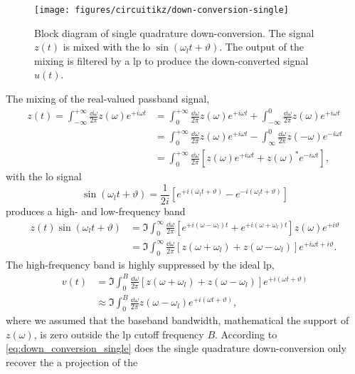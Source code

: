 \begin{figure}[htb]
	\centering
	\texttt{[image: figures/circuitikz/down-conversion-single]}
	\caption{Block diagram of single quadrature down-conversion. The signal $z(t)$ is mixed with the \gls{lo} $\sin(\omega_lt+\vartheta)$. The output of the mixing is filtered by a \gls{lp} to produce the down-converted signal $u(t)$.}\label{fig:down_conversion_single}
\end{figure}
The mixing of the real-valued passband signal,
\begin{equation}
	\begin{split}
		z(t)
		=
		\int_{-\infty}^{+\infty}\frac{\dd{\omega}}{2\pi}
		z(\omega)
		e^{+i\omega t}
		&=
		\int_0^{+\infty}\frac{\dd{\omega}}{2\pi}
		z(\omega)
		e^{+i\omega t}
		+
		\int_{-\infty}^0\frac{\dd{\omega}}{2\pi}
		z(\omega)
		e^{+i\omega t}
		\\
		&=
		\int_0^{+\infty}\frac{\dd{\omega}}{2\pi}
		z(\omega)
		e^{+i\omega t}
		-
		\int_{\infty}^0\frac{\dd{\omega}}{2\pi}
		z(-\omega)
		e^{-i\omega t}
		\\
		&=
		\int_0^{+\infty}\frac{\dd{\omega}}{2\pi}
		\left[
			z(\omega)
			e^{+i\omega t}
			+
			z(\omega)^*
			e^{-i\omega t}
		\right]
		,
	\end{split}
\end{equation}
with the \gls{lo} signal
\begin{equation}
	\sin(\omega_lt+\vartheta)
	=
	\frac{1}{2i}
	\left[
		e^{+i(\omega_lt+\vartheta)}
		-
		e^{-i(\omega_lt+\vartheta)}
	\right]
\end{equation}
produces a high- and low-frequency band
\begin{equation}
	\begin{split}
		z(t)
		\sin(\omega_lt+\vartheta)
		&=
		\Im
		\int_0^\infty\frac{\dd{\omega}}{2\pi}
		\left[
			e^{+i(\omega-\omega_l)t}
			+
			e^{+i(\omega+\omega_l)t}
		\right]
		z(\omega)
		e^{+i\vartheta}
		\\
		&=
		\Im
		\int_0^\infty\frac{\dd{\omega}}{2\pi}
		\left[
			z(\omega+\omega_l)
			+
			z(\omega-\omega_l)
		\right]
		e^{+i\omega t+i\vartheta}
		.
	\end{split}
\end{equation}
The high-frequency band is highly suppressed by the ideal \gls{lp},
\begin{equation}
	\begin{split}
		v(t)
		&=
		\Im
		\int_0^B\frac{\dd{\omega}}{2\pi}
		\left[
			z(\omega+\omega_l)
			+
			z(\omega-\omega_l)
		\right]
		e^{+i(\omega t+\vartheta)}
		\\
		&\approx
		\Im
		\int_0^B\frac{\dd{\omega}}{2\pi}
		z(\omega-\omega_l)
		e^{+i(\omega t+\vartheta)}
		,
	\end{split}
	\label{eq:down_conversion_imag}
\end{equation}
where we assumed that the baseband bandwidth, mathematical the support of $z(\omega)$, is zero outside the \gls{lp} cutoff frequency $B$.
According to \cref{eq:down_conversion_single} does the single quadrature down-conversion only recover the a projection of the 

